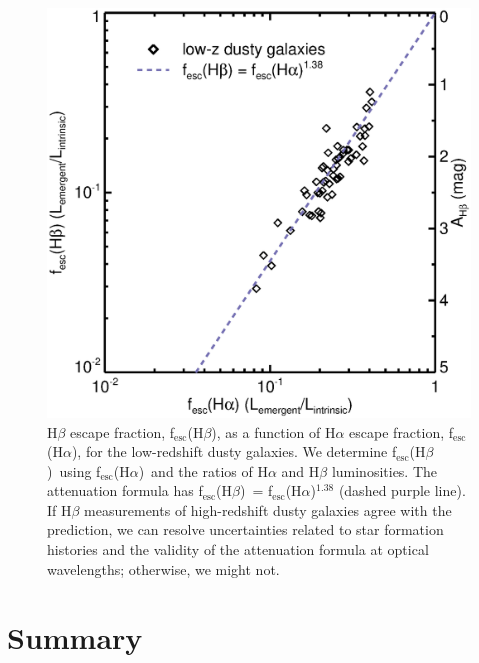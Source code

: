 \documentclass[preprint]{aastex}
\newcommand{\alephha}{f$_{\mathrm{esc}}$(H$\alpha$)}
\newcommand{\alephhb}{f$_{\mathrm{esc}}$(H$\beta$)}
\begin{document}
\begin{figure}[!ht]
\centering
\includegraphics[scale=0.5]{ahb_aha_lowzdog.eps}
\caption{H$\beta$ escape fraction, \alephhb, as a function of H$\alpha$ escape
fraction, \alephha, for the low-redshift dusty galaxies.  We determine
\alephhb~using \alephha~and the ratios of H$\alpha$ and H$\beta$ luminosities.
The \citet{calzetti00} attenuation formula has \alephhb~= \alephha$^{1.38}$
(dashed purple line).  If H$\beta$ measurements of high-redshift dusty galaxies
agree with the prediction, we can resolve uncertainties related to star
formation histories and the validity of the \citet{calzetti00} attenuation
formula at optical
wavelengths; otherwise, we might not.\label{ahb}}
\end{figure}

\section{Summary}\label{sec:conclude}
\end{document}
